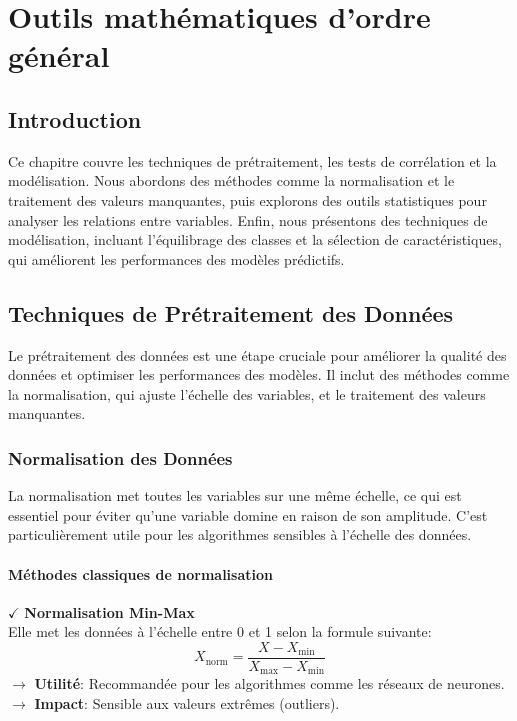 \chapter{Outils mathématiques d'ordre général}
\begin{spacing}{1.2}
\minitoc
\thispagestyle{MyStyle}
\end{spacing}
\newpage
\justifying

\section{Introduction}

Ce chapitre couvre les techniques de prétraitement, les tests de corrélation et la modélisation. Nous abordons des méthodes comme la normalisation et le traitement des valeurs manquantes, puis explorons des outils statistiques pour analyser les relations entre variables. Enfin, nous présentons des techniques de modélisation, incluant l’équilibrage des classes et la sélection de caractéristiques, qui améliorent les performances des modèles prédictifs.

\section{Techniques de Prétraitement des Données}

Le prétraitement des données est une étape cruciale pour améliorer la qualité des données et optimiser les performances des modèles. Il inclut des méthodes comme la normalisation, qui ajuste l'échelle des variables, et le traitement des valeurs manquantes.

\subsection{Normalisation des Données}

La normalisation met toutes les variables sur une même échelle, ce qui est essentiel pour éviter qu'une variable domine en raison de son amplitude. C’est particulièrement utile pour les algorithmes sensibles à l'échelle des données.

\subsubsection{Méthodes classiques de normalisation}

\textbf{\(\checkmark\)} \textbf{Normalisation Min-Max} \\
Elle met les données à l’échelle entre 0 et 1 selon la formule suivante: 
    \[
    X_{\text{norm}} = \frac{X - X_{\text{min}}}{X_{\text{max}} - X_{\text{min}}}
    \]
\textbf{\(\rightarrow\)} \textbf{Utilité}: Recommandée pour les algorithmes comme les réseaux de neurones.\\
\textbf{\(\rightarrow\)} \textbf{Impact}: Sensible aux valeurs extrêmes (outliers).

